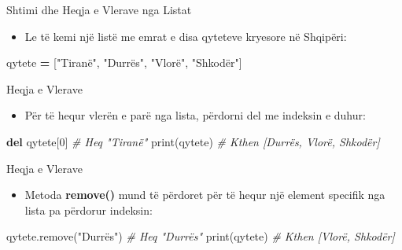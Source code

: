 \documentclass[
  ignorenonframetext,
]{beamer}
\newenvironment{Shaded}{\begin{snugshade}}{\end{snugshade}}
\newcommand{\BuiltInTok}[1]{#1}
\newcommand{\CommentTok}[1]{\textcolor[rgb]{0.56,0.35,0.01}{\textit{#1}}}
\newcommand{\DecValTok}[1]{\textcolor[rgb]{0.00,0.00,0.81}{#1}}
\newcommand{\KeywordTok}[1]{\textcolor[rgb]{0.13,0.29,0.53}{\textbf{#1}}}
\newcommand{\NormalTok}[1]{#1}
\newcommand{\OperatorTok}[1]{\textcolor[rgb]{0.81,0.36,0.00}{\textbf{#1}}}
\newcommand{\StringTok}[1]{\textcolor[rgb]{0.31,0.60,0.02}{#1}}
\providecommand{\tightlist}{%
  \setlength{\itemsep}{0pt}\setlength{\parskip}{0pt}}
\begin{document}
\begin{frame}[fragile]{Shtimi dhe Heqja e Vlerave nga Listat}
\protect\hypertarget{shtimi-dhe-heqja-e-vlerave-nga-listat}{}
\begin{itemize}
\tightlist
\item
  Le të kemi një listë me emrat e disa qyteteve kryesore në Shqipëri:
\end{itemize}

\begin{Shaded}
\begin{Highlighting}[]
\NormalTok{  qytete }\OperatorTok{=}\NormalTok{ [}\StringTok{"Tiranë"}\NormalTok{, }\StringTok{"Durrës"}\NormalTok{, }\StringTok{"Vlorë"}\NormalTok{, }\StringTok{"Shkodër"}\NormalTok{]}
\end{Highlighting}
\end{Shaded}
\end{frame}

\begin{frame}[fragile]{Heqja e Vlerave}
\protect\hypertarget{heqja-e-vlerave}{}
\begin{itemize}
\tightlist
\item
  Për të hequr vlerën e parë nga lista, përdorni del me indeksin e
  duhur:
\end{itemize}

\begin{Shaded}
\begin{Highlighting}[]
\KeywordTok{del}\NormalTok{ qytete[}\DecValTok{0}\NormalTok{]  }\CommentTok{\# Heq "Tiranë"}
\BuiltInTok{print}\NormalTok{(qytete)  }\CommentTok{\# Kthen [\textquotesingle{}Durrës\textquotesingle{}, \textquotesingle{}Vlorë\textquotesingle{}, \textquotesingle{}Shkodër\textquotesingle{}]}
\end{Highlighting}
\end{Shaded}
\end{frame}

\begin{frame}[fragile]{Heqja e Vlerave}
\protect\hypertarget{heqja-e-vlerave-1}{}
\begin{itemize}
\tightlist
\item
  Metoda \textbf{remove()} mund të përdoret për të hequr një element
  specifik nga lista pa përdorur indeksin:
\end{itemize}

\begin{Shaded}
\begin{Highlighting}[]
\NormalTok{qytete.remove(}\StringTok{"Durrës"}\NormalTok{)  }\CommentTok{\# Heq "Durrës"}
\BuiltInTok{print}\NormalTok{(qytete)  }\CommentTok{\# Kthen [\textquotesingle{}Vlorë\textquotesingle{}, \textquotesingle{}Shkodër\textquotesingle{}]}
\end{Highlighting}
\end{Shaded}
\end{frame}
\end{document}

